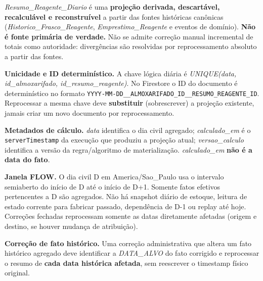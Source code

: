 \begin{explicacao}
\textit{Resumo\_Reagente\_Diario} é uma \textbf{projeção derivada, descartável, recalculável e reconstruível} a partir das fontes históricas canônicas (\textit{Historico\_Frasco\_Reagente}, \textit{Emprestimo\_Reagente} e eventos de domínio). \textbf{Não é fonte primária de verdade.} Não se admite correção manual incremental de totais como autoridade: divergências são resolvidas por reprocessamento absoluto a partir das fontes.

\textbf{Unicidade e ID determinístico.} A chave lógica diária é \textit{UNIQUE(data, id\_almoxarifado, id\_resumo\_reagente)}. No Firestore o ID do documento é determinístico no formato \texttt{YYYY-MM-DD\_\_ALMOXARIFADO\_ID\_\_RESUMO\_REAGENTE\_ID}. Reprocessar a mesma chave deve \textbf{substituir} (sobrescrever) a projeção existente, jamais criar um novo documento por reprocessamento.

\textbf{Metadados de cálculo.} \textit{data} identifica o dia civil agregado; \textit{calculado\_em} é o \texttt{serverTimestamp} da execução que produziu a projeção atual; \textit{versao\_calculo} identifica a versão da regra/algoritmo de materialização. \textit{calculado\_em} \textbf{não é a data do fato}.

\textbf{Janela FLOW.} O dia civil D em America/Sao\_Paulo usa o intervalo semiaberto do início de D até o início de D+1. Somente fatos efetivos pertencentes a D são agregados. Não há snapshot diário de estoque, leitura de estado corrente para fabricar passado, dependência de D-1 ou replay até hoje. Correções fechadas reprocessam somente as datas diretamente afetadas (origem e destino, se houver mudança de atribuição).

\textbf{Correção de fato histórico.} Uma correção administrativa que altera um fato histórico agregado deve identificar a \textit{DATA\_ALVO} do fato corrigido e reprocessar o resumo de \textbf{cada data histórica afetada}, sem reescrever o timestamp físico original.
\end{explicacao}

